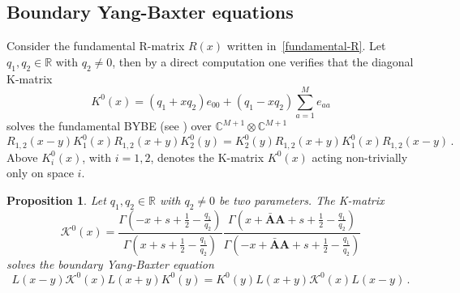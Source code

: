 \documentclass[11pt]{article}
\numberwithin{equation}{section}
\newtheorem{proposition}[theorem]{Proposition}
\newcommand{\OA}{\mathbf{A}}
\newcommand{\OAD}{\mathbf{\bar{A}}}
\newcommand{\M}{M}
\newcommand{\fundR}{R}
\newcommand{\Khat}{\mathcal{K}^{0}}
\newcommand{\Khatfund}{K^{0}}
\begin{document}
\subsection{Boundary Yang-Baxter equations}\label{Section-BYBE}
Consider the fundamental R-matrix $\fundR(x)$ written in~\eqref{fundamental-R}. Let $q_{1},q_{2}\in \mathbb{R}$ with $q_{2}\neq 0$, then by a direct computation one verifies that the diagonal K-matrix 
\begin{equation}\label{K-fund}
    \Khatfund(x)=(q_{1}+xq_{2})e_{00}+(q_{1}-xq_{2})\sum_{a=1}^{\M}e_{aa}
\end{equation}  
solves the fundamental BYBE (see \cite{Sklyanin:1988yz,crampe2014integrable}) over $\mathbb{C}^{\M+1}\otimes\mathbb{C}^{\M+1}$
\begin{equation}\label{fundamental-BYBE}
    \fundR_{1,2}(x-y)K_{1}^{0}(x)\fundR_{1,2}(x+y)K_{2}^{0}(y)=K_{2}^{0}(y)\fundR_{1,2}(x+y)K_{1}^{0}(x)\fundR_{1,2}(x-y)\,.
\end{equation}
Above $K_{i}^{0}(x)$, with $i=1,2$, denotes the K-matrix $\Khatfund(x)$ acting non-trivially only on space $i$.
\begin{proposition}\label{Proposition-right-Kmatrix}
Let $q_{1},q_{2}\in \mathbb{R}$ with $q_{2}\neq 0$ be two parameters. The K-matrix  
\begin{equation}\label{K-hatShifted}
 \Khat(x)=\frac{\Gamma\left(-x+s+\frac{1}{2}-\frac{q_{1}}{q_{2}}\right)}{\Gamma\left(x+s+\frac{1}{2}-\frac{q_{1}}{q_{2}}\right)}\frac{\Gamma\left(x+\OAD\OA+s+\frac{1}{2}-\frac{q_{1}}{q_{2}}\right)}{\Gamma\left(-x+\OAD\OA+s+\frac{1}{2}-\frac{q_{1}}{q_{2}}\right)}
\end{equation}
 		solves the boundary Yang-Baxter equation
\begin{equation}\label{shifted-BYBE}
L(x-y)\Khat(x){L}(x+y)\Khatfund(y)=\Khatfund(y)L(x+y)\Khat(x){L}(x-y)\,.
\end{equation}
       

\end{proposition}
\end{document}
